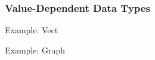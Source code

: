 \begin{frame}[fragile]
\frametitle{Value-Dependent Data Types}

\begin{block}{Example: Vect}

\end{block}

\begin{block}{Example: Graph}


\end{block}

\end{frame}

